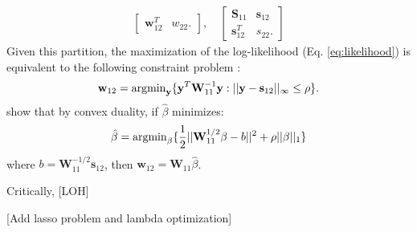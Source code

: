 \begin{DoubleSpace*}
\begin{align}
\begin{bmatrix}
\textbf{w}_{12}^T & w_{22}.
\end{bmatrix}, \quad
\begin{bmatrix}
\textbf{S}_{11} & \textbf{s}_{12} \\
\textbf{s}_{12}^T & s_{22}.
\end{bmatrix}
\end{align}  
Given this partition, the maximization of the log-likelihood (Eq. \ref{eq:likelihood}) is equivalent to the following constraint problem \cite{banerjee2008}:
\begin{align}
\textbf{w}_{12}=\operatorname{argmin}_{\textbf{y}} \{ \textbf{y}^T \textbf{W}_{11} ^{-1} \textbf{y} : ||\textbf{y}-\textbf{s}_{12}||_{\infty} \leq \rho \}.
\end{align}
\cite{banerjee2008} show that by convex duality, if $\hat{\beta}$ minimizes:
\begin{align}
\hat{\beta}=\operatorname{argmin}_{\beta} \{\frac{1}{2} ||\textbf{W}_{11}^{1/2}\beta-b||^2 +\rho ||\beta||_1 \}
\label{eq:dual}
\end{align}
where $b=\textbf{W}_{11}^{-1/2} \textbf{s}_{12}$, then $\textbf{w}_{12}=\textbf{W}_{11} \hat{\beta}$.

Critically, \cite{friedman2007} [LOH]

[Add lasso problem and lambda optimization]


\end{DoubleSpace*}
